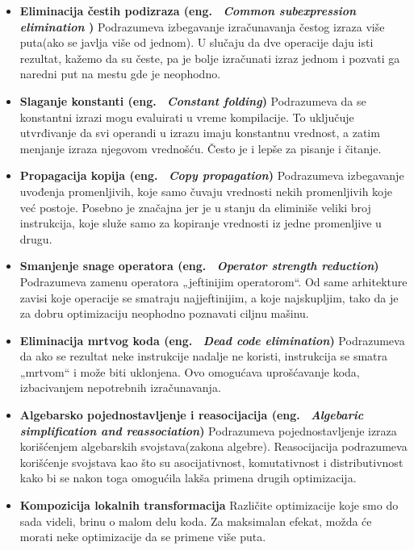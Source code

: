 \documentclass[a4paper]{article}
\begin{document}
\begin{itemize}
  \item \textbf{Eliminacija čestih podizraza (eng. ~{\em Common subexpression elimination} )} \newline
  Podrazumeva izbegavanje izračunavanja čestog izraza više puta(ako se javlja više od jednom). 
  U slučaju da dve operacije daju isti rezultat, kažemo da su česte, pa je bolje izračunati izraz jednom i pozvati ga naredni put na mestu gde je neophodno.

  \item \textbf{Slaganje konstanti (eng. ~{\em Constant folding})} \newline
  Podrazumeva da se konstantni izrazi mogu evaluirati u vreme kompilacije. To uključuje utvrđivanje da svi operandi u izrazu imaju konstantnu vrednost, a zatim menjanje izraza njegovom vrednošću.
  Često je i lepše za pisanje i čitanje. 
  \item \textbf{Propagacija kopija (eng. ~{\em Copy propagation})} \newline
  Podrazumeva izbegavanje uvođenja promenljivih, koje samo čuvaju vrednosti nekih promenljivih koje već postoje.
  Posebno je značajna jer je u stanju da eliminiše veliki broj instrukcija, koje služe samo za kopiranje vrednosti iz jedne promenljive u drugu.
  \item \textbf{Smanjenje snage operatora (eng. ~{\em Operator strength reduction})} \newline
  Podrazumeva zamenu operatora „jeftinijim operatorom“. 
  Od same arhitekture zavisi koje operacije se smatraju najjeftinijim, a koje najskupljim, tako da je za dobru optimizaciju neophodno poznavati ciljnu mašinu.
  \item \textbf{Eliminacija mrtvog koda (eng. ~{\em Dead code elimination})} \newline
  Podrazumeva da ako se rezultat neke instrukcije nadalje ne koristi, instrukcija se smatra „mrtvom“ i može biti uklonjena. 
  Ovo omogućava uprošćavanje koda, izbacivanjem nepotrebnih izračunavanja.
  \item \textbf{Algebarsko pojednostavljenje i reasocijacija (eng. ~{\em Algebaric simplification and reassociation})} \newline
  Podrazumeva pojednostavljenje izraza korišćenjem algebarskih svojstava(zakona algebre). Reasocijacija podrazumeva korišćenje svojstava kao što su asocijativnost, komutativnost i distributivnost kako bi se nakon toga omogućila lakša primena drugih optimizacija.
  \item \textbf{Kompozicija lokalnih transformacija} \newline
  Različite optimizacije koje smo do sada videli, brinu o malom delu koda. 
  Za maksimalan efekat, možda će morati neke optimizacije da se primene više puta.  \cite{fogOptimizacije}

\end{itemize}
\end{document}
